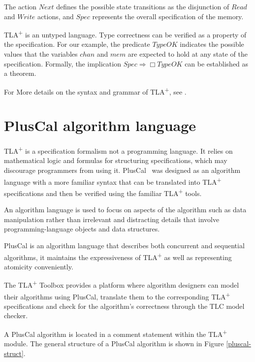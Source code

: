 \documentclass{thesul}
\newcommand{\tlaplus}{TLA\textsuperscript{+}\xspace}
\begin{document}
The action $Next$ defines the possible state transitions as the disjunction of $Read$ and $Write$ actions, and $Spec$ represents the overall specification of the memory.

\tlaplus is an untyped language. Type correctness can be verified as a property of the specification. For our example, the predicate $TypeOK$ indicates the possible values that the variables $chan$ and $mem$ are expected to hold at any state of the specification. Formally, the implication $Spec \Rightarrow \Box TypeOK$ can be established as a theorem.

\bigskip


For More details on the syntax and grammar of \tlaplus, see \cite{tlabook} \cite{tlaplus}.

\section{PlusCal algorithm language}

\tlaplus is a specification formalism not a programming language. It relies on mathematical logic and formulas for structuring specifications, which may discourage programmers from using it. PlusCal~\cite{pcalAlgo} was designed as an algorithm language with a more familiar syntax that can be translated into \tlaplus specifications and then be verified using the familiar \tlaplus tools.

An algorithm language is used to focus on aspects of the algorithm such as data manipulation rather than irrelevant and distracting details that involve programming-language objects and data structures.
	
PlusCal is an algorithm language that describes both concurrent and sequential algorithms, it maintains the expressiveness of \tlaplus as well as representing atomicity conveniently.

The \tlaplus Toolbox provides a platform where algorithm designers can model their algorithms using PlusCal, translate them to the corresponding \tlaplus specifications and check for the algorithm's correctness through the TLC model checker.

A PlusCal algorithm is located in a comment statement within the \tlaplus module. The general structure of a PlusCal algorithm is shown in Figure \ref{pluscal-struct}.
\end{document}
